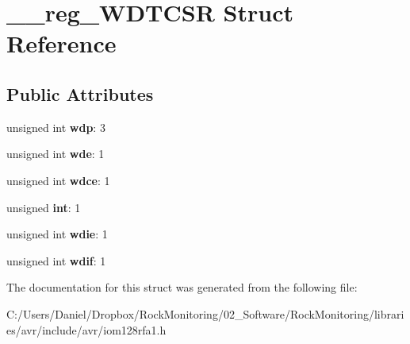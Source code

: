 \hypertarget{struct____reg___w_d_t_c_s_r}{}\section{\+\_\+\+\_\+reg\+\_\+\+W\+D\+T\+C\+SR Struct Reference}
\label{struct____reg___w_d_t_c_s_r}
\subsection*{Public Attributes}
\begin{DoxyCompactItemize}
\item 
unsigned int {\bfseries wdp}\+: 3\hypertarget{struct____reg___w_d_t_c_s_r_af58c7f465c0c3b08c71e6d65b76926a4}{}\label{struct____reg___w_d_t_c_s_r_af58c7f465c0c3b08c71e6d65b76926a4}

\item 
unsigned int {\bfseries wde}\+: 1\hypertarget{struct____reg___w_d_t_c_s_r_ae75ed34c8411afdfd9d1a216fe1efab3}{}\label{struct____reg___w_d_t_c_s_r_ae75ed34c8411afdfd9d1a216fe1efab3}

\item 
unsigned int {\bfseries wdce}\+: 1\hypertarget{struct____reg___w_d_t_c_s_r_a74b7ccc46b9d372baa31bd1040d50e56}{}\label{struct____reg___w_d_t_c_s_r_a74b7ccc46b9d372baa31bd1040d50e56}

\item 
unsigned {\bfseries int}\+: 1\hypertarget{struct____reg___w_d_t_c_s_r_a8a552e213d4d2a08c05c58be489a9792}{}\label{struct____reg___w_d_t_c_s_r_a8a552e213d4d2a08c05c58be489a9792}

\item 
unsigned int {\bfseries wdie}\+: 1\hypertarget{struct____reg___w_d_t_c_s_r_abf9104897706bb012f739750fcc201d5}{}\label{struct____reg___w_d_t_c_s_r_abf9104897706bb012f739750fcc201d5}

\item 
unsigned int {\bfseries wdif}\+: 1\hypertarget{struct____reg___w_d_t_c_s_r_a93c7fa5561b201bb9878ab47f3a0811a}{}\label{struct____reg___w_d_t_c_s_r_a93c7fa5561b201bb9878ab47f3a0811a}

\end{DoxyCompactItemize}


The documentation for this struct was generated from the following file\+:\begin{DoxyCompactItemize}
\item 
C\+:/\+Users/\+Daniel/\+Dropbox/\+Rock\+Monitoring/02\+\_\+\+Software/\+Rock\+Monitoring/libraries/avr/include/avr/iom128rfa1.\+h\end{DoxyCompactItemize}
